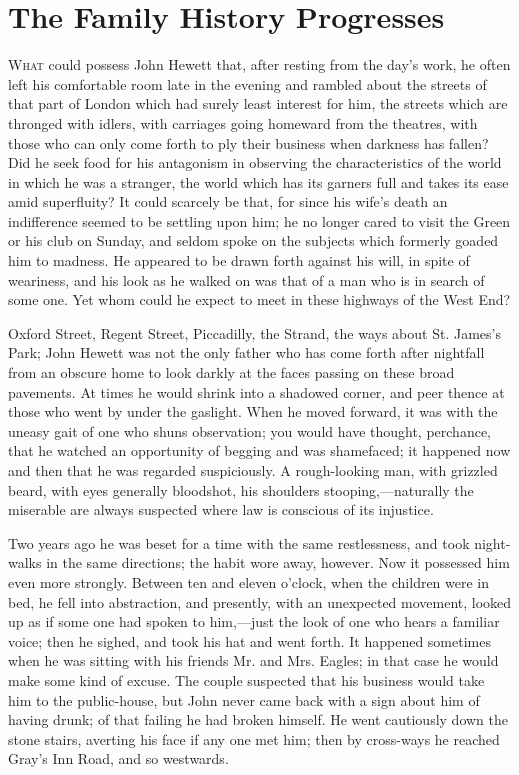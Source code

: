 \chapter{The Family History Progresses}

\textsc{What} could possess John Hewett that, after resting from the
day's work, he often left his comfortable room late in the evening and
rambled about the streets of that part of London which had surely least
interest for him, the streets which are thronged with idlers, with
carriages going homeward from the theatres, with those who can only come
forth to ply their business when darkness has fallen? Did he seek food
for his antagonism in observing the characteristics of the world in
which he was a stranger, the world which has its garners full and takes
its ease amid superfluity? It could scarcely be that, for since his
wife's death an indifference seemed to be settling upon him; he no
longer cared to visit the Green or his club on Sunday, and seldom spoke
on the subjects which formerly goaded {\protect\hypertarget{217}{}{}}him
to madness. He appeared to be drawn forth against his will, in spite of
weariness, and his look as he walked on was that of a man who is in
search of some one. Yet whom could he expect to meet in these highways
of the West End?

Oxford Street, Regent Street, Piccadilly, the Strand, the ways about St.
James's Park; John Hewett was not the only father who has come forth
after nightfall from an obscure home to look darkly at the faces passing
on these broad pavements. At times he would shrink into a shadowed
corner, and peer thence at those who went by under the gaslight. When he
moved forward, it was with the uneasy gait of one who shuns observation;
you would have thought, perchance, that he watched an opportunity of
begging and was shamefaced; it happened now and then that he was
regarded suspiciously. A rough-looking man, with grizzled beard, with
eyes generally bloodshot, his shoulders stooping,---naturally the
miserable are always suspected where law is conscious of its injustice.

{\protect\hypertarget{218}{}{}}Two years ago he was beset for a time
with the same restlessness, and took night-walks in the same directions;
the habit wore away, however. Now it possessed him even more strongly.
Between ten and eleven o'clock, when the children were in bed, he fell
into abstraction, and presently, with an unexpected movement, looked up
as if some one had spoken to him,---just the look of one who hears a
familiar voice; then he sighed, and took his hat and went forth. It
happened sometimes when he was sitting with his friends Mr. and Mrs.
Eagles; in that case he would make some kind of excuse. The couple
suspected that his business would take him to the public-house, but John
never came back with a sign about him of having drunk; of that failing
he had broken himself. He went cautiously down the stone stairs,
averting his face if any one met him; then by cross-ways he reached
Gray's Inn Road, and so westwards.

